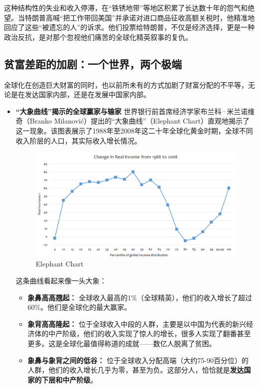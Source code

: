 这种结构性的失业和收入停滞，在“铁锈地带”等地区积累了长达数十年的怨气和绝望。当特朗普高喊“把工作带回美国”并承诺对进口商品征收高额关税时，他精准地回应了这些“被遗忘的人”的诉求。他们投票给特朗普，不仅是经济选择，更是一种政治反抗，是对那个忽视他们痛苦的全球化精英叙事的复仇。

\subsection{ 贫富差距的加剧：一个世界，两个极端}

全球化在创造巨大财富的同时，也以前所未有的方式加剧了财富分配的不平等，无论是在发达国家内部，还是在发展中国家内部。

\begin{itemize}
\item \textbf{“大象曲线”揭示的全球赢家与输家}
世界银行前首席经济学家布兰科·米兰诺维奇（Branko Milanović）提出的“大象曲线”（Elephant Chart）直观地揭示了这一现象。该图表展示了1988年至2008年这二十年全球化黄金时期，全球不同收入阶层的人口，其实际收入增长情况。


\begin{figure}[h!]
    \centering
    \includegraphics[width=\textwidth]{elephant_chart.png}
    \caption{Elephant Chart}
    \label{fig:elephant_chart}
\end{figure}

这条曲线看起来像一头大象：
\begin{itemize}
\item \textbf{象鼻高高翘起：} 全球收入最高的1\%（全球精英），他们的收入增长了超过60\%。他们是全球化的最大赢家。
\item \textbf{象背高高隆起：} 位于全球收入中段的人群，主要是以中国为代表的新兴经济体的中产阶级，他们的收入实现了惊人的增长，很多人实现了翻番甚至更多。这是全球化最值得称道的成就——数亿人脱离了贫困。
\item \textbf{象鼻与象背之间的低谷：} 位于全球收入分配高端（大约75-90百分位）的人群，他们的收入增长几乎为零，甚至为负。这部分人，恰恰就是\textbf{发达国家的下层和中产阶级}。
\end{itemize}


\end{itemize}
